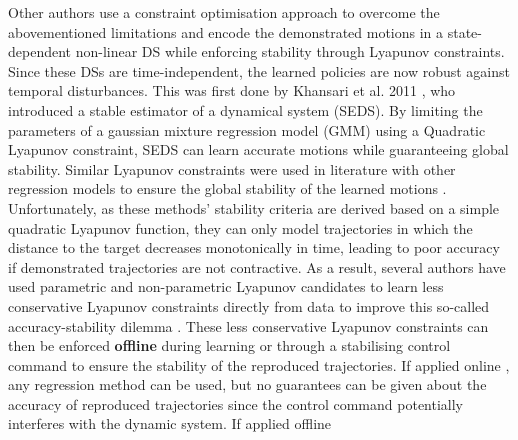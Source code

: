 
Other authors use a constraint optimisation approach to overcome the abovementioned limitations and encode the demonstrated motions in a state-dependent non-linear DS while enforcing stability through Lyapunov constraints. Since these DSs are time-independent, the learned policies are now robust against temporal disturbances. This was first done by Khansari et al. 2011 \cite{khansari-zadehLearningStableNonlinear2011}, who introduced a stable estimator of a dynamical system (SEDS). By limiting the parameters of a gaussian mixture regression model (GMM) using a Quadratic Lyapunov constraint, SEDS can learn accurate motions while guaranteeing global stability. Similar Lyapunov constraints were used in literature with other regression models to ensure the global stability of the learned motions \cite{lemmeNeurallyImprintedStable2013,huNeuralLearningStable2015,umlauftLearningStableStochastic2017,umlauftLearningStableGaussian2017,medinaLearningStableTask2017,duanFastStableLearning2019,xuRobotTrajectoryTracking2019,umlauftLearningStochasticallyStable2020,ledererGaussianProcessBasedRealTime2021,xuLearningBasedKinematicControl2022,salehiLearningDiscreteTimeUncertain2022,davoodiRuleBasedSafeProbabilistic2022}. Unfortunately, as these methods' stability criteria are derived based on a simple quadratic Lyapunov function, they can only model trajectories in which the distance to the target decreases monotonically in time, leading to poor accuracy if demonstrated trajectories are not contractive. As a result, several authors have used parametric and non-parametric Lyapunov candidates to learn less conservative Lyapunov constraints directly from data to improve this so-called accuracy-stability dilemma \cite{khansari-zadehLearningControlLyapunov2014,neumannNeuralLearningStable2013,lemmeNeuralLearningVector2014,umlauftLearningStableGaussian2017,umlauftUncertaintybasedControlLyapunov2018,duttaLearningStableMovement2018,umlauftUncertaintybasedHumanMotion2019,duttaSkillLearningHuman2021,ravanbakhshLearningControlLyapunov2019,ravanbakhshFormalPolicyLearning2019,umlauftLearningStochasticallyStable2020,xiaoLearningStableNonparametric2020,tesfazgiInverseReinforcementLearning2021,coulombeGeneratingStableCollisionFree2022}. These less conservative Lyapunov constraints can then be enforced \textbf{offline} during learning or  through a stabilising control command to ensure the stability of the reproduced trajectories. If applied online \cite{khansari-zadehLearningControlLyapunov2014,umlauftLearningStableGaussian2017,umlauftUncertaintybasedControlLyapunov2018,duttaLearningStableMovement2018,umlauftUncertaintybasedHumanMotion2019,ravanbakhshFormalPolicyLearning2019,ravanbakhshLearningControlLyapunov2019,xiaoLearningStableNonparametric2020,duttaSkillLearningHuman2021,umlauftLearningStochasticallyStable2020}, any regression method can be used, but no guarantees can be given about the accuracy of reproduced trajectories since the control command potentially interferes with the dynamic system. If applied offline 